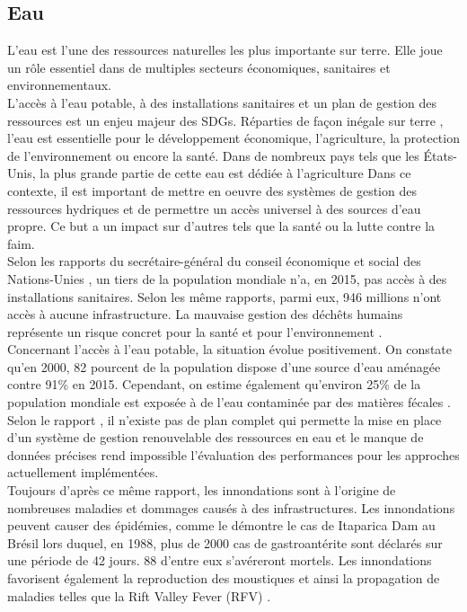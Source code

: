\documentclass[10pt, conference, compsocconf]{llncs}
\begin{document}
	\subsection{Eau}
			L'eau est l'une des ressources naturelles les plus importante sur terre. Elle joue un rôle essentiel dans de multiples secteurs économiques, sanitaires et environnementaux.\\
			L'accès à l'eau potable, à des installations sanitaires et un plan de gestion des ressources est un enjeu majeur des SDGs. Réparties de façon inégale sur terre %
			, l'eau est essentielle pour le développement économique, l'agriculture, la protection de l'environnement ou encore la santé. Dans de nombreux pays tels que les États-Unis, la plus grande partie de cette eau est dédiée à l'agriculture %
			Dans ce contexte, il est important de mettre en oeuvre des systèmes de gestion des ressources hydriques et de permettre un accès universel à des sources d'eau propre. Ce but a un impact sur d'autres tels que la santé ou la lutte contre la faim.\\
			Selon les rapports du secrétaire-général du conseil économique et social des Nations-Unies \cite{united_nations_economic_and_social_council_progress_2017}\cite{united_nations_economic_and_social_council_progress_2017-1}, un tiers de la population mondiale n'a, en 2015, pas accès à des installations sanitaires. Selon les même rapports, parmi eux, 946 millions n'ont accès à aucune infrastructure. La mauvaise gestion des déchêts humains représente un risque concret pour la santé et pour l'environnement \cite{ashbolt_microbial_2004}.\\
			Concernant l'accès à l'eau potable, la situation évolue positivement. On constate qu'en 2000, 82 pourcent de la population dispose d'une source d'eau aménagée contre 91\% en 2015. Cependant, on estime également qu'environ 25\% de la population mondiale est exposée à de l'eau contaminée par des matières fécales \cite{united_nations_goal_nodate-4}. \\
			Selon le rapport \cite{rana_water_2017}, il n'existe pas de plan complet qui permette la mise en place d'un système de gestion renouvelable des ressources en eau et le manque de données précises rend impossible l'évaluation des performances pour les approches actuellement implémentées. \\
			Toujours d'après ce même rapport, les innondations sont à l'origine de nombreuses maladies et dommages causés à des infrastructures. Les innondations peuvent causer des épidémies, comme le démontre le cas de Itaparica Dam au Brésil lors duquel, en 1988, plus de 2000 cas de gastroantérite sont déclarés sur une période de 42 jours. 88 d'entre eux s'avéreront mortels. Les innondations favorisent également la reproduction des moustiques et ainsi la propagation de maladies telles que la Rift Valley Fever (RFV) \cite{hanafi_rift_2010}.\\
\end{document}
